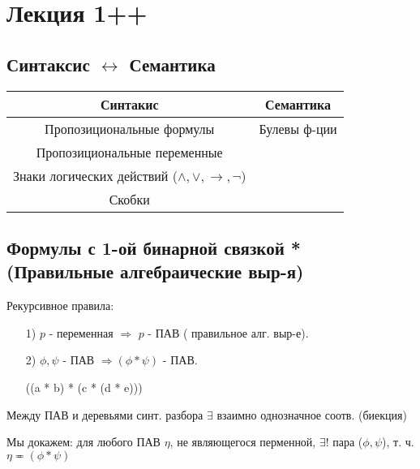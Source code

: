 \section{Лекция 1++}

\subsection{Синтаксис $\leftrightarrow$ Семантика}
\begin{center}
\begin{tabular}{ |c|c| }
 \hline
 Синтакис & Семантика \\
 \hline
 Пропозициональные формулы & Булевы ф-ции \\
 Пропозициональные переменные & \\
 Знаки логических действий ($\land, \lor, \rightarrow, \neg$)& \\
 Скобки & \\
 \hline
\end{tabular}
\end{center}

\subsection{Формулы с 1-ой бинарной связкой * \\ (Правильные алгебраические выр-я)}

Рекурсивное правила:
\begin{enumerate}
    \item [1) ] $p$ - переменная $\Rightarrow$ $p$ - ПАВ ( правильное алг. выр-е).
    \item [2) ] $\phi, \psi$ - ПАВ $\Rightarrow (\phi * \psi)$ - ПАВ.
        \begin{example}
            ((a * b) * (c * (d * e)))
        \end{example}
\end{enumerate}

\begin{theorem}
Между ПАВ и деревьями синт. разбора $\exists $ взаимно однозначное соотв. (биекция)
\end{theorem}

Мы докажем: для любого ПАВ $\eta$, не являющегося перменной, $\exists! $ пара ($\phi, \psi$), т. ч. $\eta \eqcirc (\phi * \psi)$

